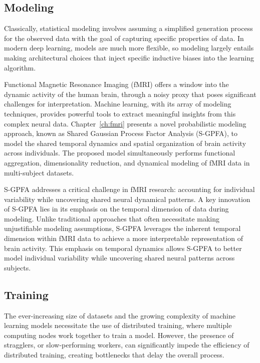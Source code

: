 \subsection{Modeling}
Classically, statistical modeling involves assuming a simplified generation process for the observed data with the goal of capturing specific properties of data. In modern deep learning, models are much more flexible, so modeling largely entails making architectural choices that inject specific inductive biases into the learning algorithm.

Functional Magnetic Resonance Imaging (fMRI) offers a window into the dynamic activity of the human brain, through a noisy proxy that poses significant challenges for interpretation. Machine learning, with its array of modeling techniques, provides powerful tools to extract meaningful insights from this complex neural data. Chapter~\ref{ch:fmri} presents a novel probabilistic modeling approach, known as Shared Gaussian Process Factor Analysis (S-GPFA), to model the shared temporal dynamics and spatial organization of brain activity across individuals. The proposed model simultaneously performs functional aggregation, dimensionality reduction, and dynamical modeling of fMRI data in multi-subject datasets. 

S-GPFA addresses a critical challenge in fMRI research: accounting for individual variability while uncovering shared neural dynamical patterns. A key innovation of S-GPFA lies in its emphasis on the temporal dimension of data during modeling. Unlike traditional approaches that often necessitate making unjustifiable modeling assumptions, S-GPFA leverages the inherent temporal dimension within fMRI data to achieve a more interpretable representation of brain activity. This emphasis on temporal dynamics allows S-GPFA to better model individual variability while uncovering shared neural patterns across subjects.



\subsection{Training}
The ever-increasing size of datasets and the growing complexity of machine learning models necessitate the use of distributed training, where multiple computing nodes work together to train a model. However, the presence of stragglers, or slow-performing workers, can significantly impede the efficiency of distributed training, creating bottlenecks that delay the overall process. 

